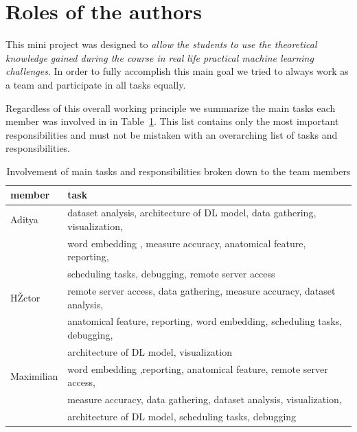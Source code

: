 \documentclass[a4paper,11pt]{article}
\begin{document}
\section{Roles of the authors}

This mini project was designed to \textit{allow the students to use the theoretical knowledge gained during the course in real life practical machine learning challenges}. In order to fully accomplish this main goal we tried to always work as a team and participate in all tasks equally.

Regardless of this overall working principle we summarize the main tasks each member was involved in in Table~\ref{tab:roles}. This list contains only the most important responsibilities and must not be mistaken with an overarching list of tasks and responsibilities.

\begin{table}[h!]
\centering
 \begin{tabular}{l |l}
 member 		& task \\ \hline
 Aditya		&  dataset analysis, architecture of DL model, data gathering, visualization, \\ 
 			& word embedding , measure accuracy, anatomical feature, reporting,  \\
			& scheduling tasks, debugging, remote server access\\ \hline
 HŽctor 		&  remote server access, data gathering, measure accuracy, dataset analysis,\\
 			& anatomical feature, reporting, word embedding, scheduling tasks, debugging, \\
			& architecture of DL model, visualization\\ \hline
 Maximilian 	& word embedding ,reporting, anatomical feature, remote server access,\\
 			& measure accuracy, data gathering, dataset analysis, visualization, \\
			& architecture of DL model, scheduling tasks, debugging
 \end{tabular}
 \captionsetup{justification=centering,margin=2cm}
 \caption{Involvement of main tasks and responsibilities broken down to the team members}
 \label{tab:roles}
\end{table}

\end{document}
